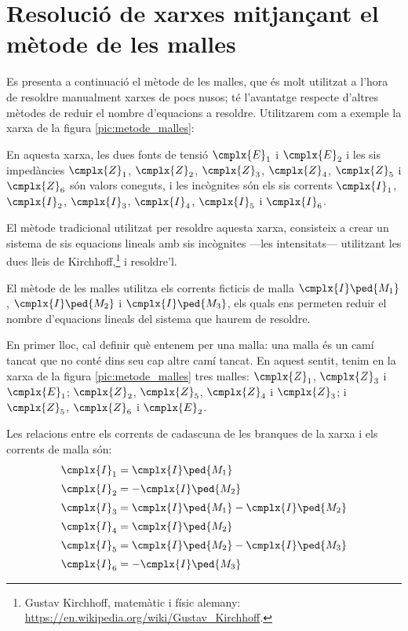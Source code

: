\section{Resolució de xarxes mitjançant el mètode de les malles}\label{sec:metode-malles}


Es presenta a continuació el mètode de les malles, que és molt utilitzat a l'hora de resoldre manualment xarxes de pocs nusos; té l'avantatge respecte d'altres mètodes de reduir el nombre d'equacions a resoldre. Utilitzarem com a exemple la xarxa de la figura \vref{pic:metode_malles}:

\begin{center}
    
     \label{pic:metode_malles}
\end{center}

En aquesta xarxa, les dues fonts de tensió $\cmplx{E}_1$ i $\cmplx{E}_2$ i les sis impedàncies $\cmplx{Z}_1$, $\cmplx{Z}_2$, $\cmplx{Z}_3$, $\cmplx{Z}_4$, $\cmplx{Z}_5$ i $\cmplx{Z}_6$  són valors coneguts, i les incògnites són els sis corrents $\cmplx{I}_1$, $\cmplx{I}_2$, $\cmplx{I}_3$, $\cmplx{I}_4$, $\cmplx{I}_5$ i $\cmplx{I}_6$.

El mètode tradicional utilitzat per  resoldre aquesta xarxa, consisteix a crear un sistema  de sis equacions lineals amb sis incògnites ---les intensitats--- utilitzant  les dues lleis de Kirchhoff,\footnote{Gustav Kirchhoff, matemàtic i físic alemany: \href{https://en.wikipedia.org/wiki/Gustav_Kirchhoff}{https:/\!\!/en.wikipedia.org/wiki/Gustav\_Kirchhoff}.} i resoldre'l.

El mètode de les malles utilitza els corrents ficticis de malla $\cmplx{I}\ped{M_1}$, $\cmplx{I}\ped{M_2}$ i $\cmplx{I}\ped{M_3}$, els quals ens permeten reduir el nombre d'equacions lineals del  sistema que haurem de resoldre.



En primer lloc, cal definir què entenem per una malla: una malla és un camí tancat que no conté dins seu cap altre camí tancat. En aquest sentit, tenim en la xarxa de la figura \vref{pic:metode_malles} tres malles: $\cmplx{Z}_1$, $\cmplx{Z}_3$ i $\cmplx{E}_1$; $\cmplx{Z}_2$, $\cmplx{Z}_5$, $\cmplx{Z}_4$ i $\cmplx{Z}_3$; i $\cmplx{Z}_5$, $\cmplx{Z}_6$ i $\cmplx{E}_2$.

Les relacions entre els corrents de cadascuna de les branques de la xarxa i els corrents de malla són:
\begin{subequations}
\begin{align}
    \cmplx{I}_1 &= \cmplx{I}\ped{M_1} \label{eq:malles1} \\[0.5ex]
    \cmplx{I}_2 &= -\cmplx{I}\ped{M_2} \\[0.5ex]
    \cmplx{I}_3 &= \cmplx{I}\ped{M_1}-\cmplx{I}\ped{M_2} \\[0.5ex]
    \cmplx{I}_4 &= \cmplx{I}\ped{M_2} \\[0.5ex]
    \cmplx{I}_5 &= \cmplx{I}\ped{M_2}-\cmplx{I}\ped{M_3} \\[0.5ex]
    \cmplx{I}_6 &= -\cmplx{I}\ped{M_3} \label{eq:malles2}
\end{align}
\end{subequations}

